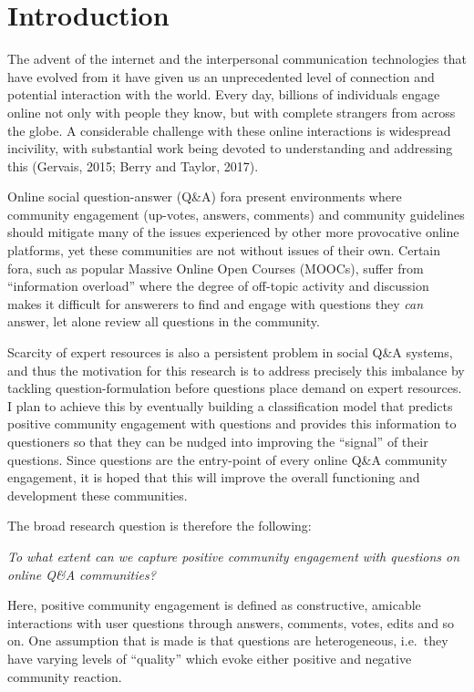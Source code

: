 \documentclass[11pt,preprint, authoryear]{article}
\numberwithin{equation}{section}
\numberwithin{figure}{section}
\numberwithin{table}{section}
\begin{document}
\section{\texorpdfstring{Introduction
\label{Intro}}{Introduction }}\label{introduction}

The advent of the internet and the interpersonal communication
technologies that have evolved from it have given us an unprecedented
level of connection and potential interaction with the world. Every day,
billions of individuals engage online not only with people they know,
but with complete strangers from across the globe. A considerable
challenge with these online interactions is widespread incivility, with
substantial work being devoted to understanding and addressing this
(Gervais, 2015; Berry and Taylor, 2017).

Online social question-answer (Q\&A) fora present environments where
community engagement (up-votes, answers, comments) and community
guidelines should mitigate many of the issues experienced by other more
provocative online platforms, yet these communities are not without
issues of their own. Certain fora, such as popular Massive Online Open
Courses (MOOCs), suffer from ``information overload'' where the degree
of off-topic activity and discussion makes it difficult for answerers to
find and engage with questions they \emph{can} answer, let alone review
all questions in the community.

Scarcity of expert resources is also a persistent problem in social Q\&A
systems, and thus the motivation for this research is to address
precisely this imbalance by tackling question-formulation before
questions place demand on expert resources. I plan to achieve this by
eventually building a classification model that predicts positive
community engagement with questions and provides this information to
questioners so that they can be nudged into improving the ``signal'' of
their questions. Since questions are the entry-point of every online
Q\&A community engagement, it is hoped that this will improve the
overall functioning and development these communities.

The broad research question is therefore the following:

\begin{center}
\emph{To what extent can we capture positive community engagement with questions on online Q\&A communities?}
\end{center}

Here, positive community engagement is defined as constructive, amicable
interactions with user questions through answers, comments, votes, edits
and so on. One assumption that is made is that questions are
heterogeneous, i.e.~they have varying levels of ``quality'' which evoke
either positive and negative community reaction.
\end{document}
